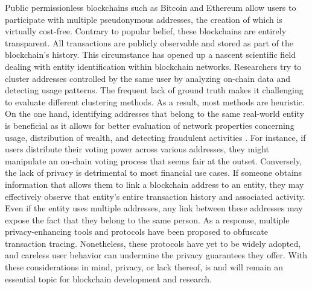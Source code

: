 \documentclass[12pt,a4paper,titlepage,oneside,english]{article}
\begin{document}
Public permissionless blockchains such as Bitcoin \citep{nakamotoBitcoin2008} and Ethereum \citep{buterin2014ethereum} allow users %
 to participate with multiple pseudonymous addresses, the creation of which is virtually cost-free. Contrary to popular belief, these blockchains are entirely transparent. All transactions are publicly observable and stored as part of the blockchain's history.
This circumstance has opened up a nascent scientific field dealing with entity identification within blockchain networks. Researchers try to cluster addresses controlled by the same user by analyzing on-chain data and detecting usage patterns. The frequent lack of ground truth makes it challenging to evaluate different clustering methods. As a result, most methods are heuristic. \newline
On the one hand, identifying addresses that belong to the same real-world entity is beneficial as it allows for better evaluation of network properties concerning usage, distribution of wealth, and detecting fraudulent activities \citep{FV:17}. For instance, if users distribute their voting power across various addresses, they might manipulate an on-chain voting process that seems fair at the outset. \newline
Conversely, the lack of privacy is detrimental to most financial use cases. If someone obtains information that allows them to link a blockchain address to an entity, they may effectively observe that entity’s entire transaction history and associated activity. Even if the entity uses multiple addresses, any link between these addresses may expose the fact that they belong to the same person.
As a response, multiple privacy-enhancing tools and protocols have been proposed to obfuscate transaction tracing. 
Nonetheless, these protocols have yet to be widely adopted, and careless user behavior can undermine the privacy guarantees they offer. \newline
With these considerations in mind, privacy, or lack thereof, is and will remain an essential topic for blockchain development and research.
\end{document}
